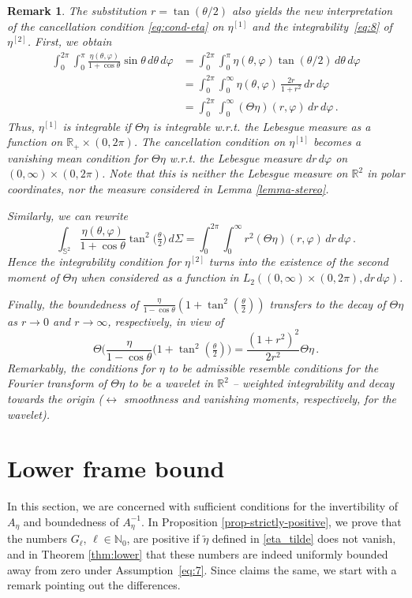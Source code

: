 \documentclass[a4paper,11pt,DIV=11,%
abstract=on%
]{scrartcl}
\newtheorem{rem}[thm]{Remark}
\def\R{{\mathbb R}}
\newcommand{\red}[1]{#1}
\begin{document}
\begin{rem}
	The substitution $r=\tan(\theta/2)$ also yields the new interpretation of the cancellation condition \eqref{eq:cond-eta} on $\eta^{[1]}$
		and the integrability~\red{\eqref{eq:8}} of $\eta^{[2]}$. First, we obtain
	\begin{align*}
		\int_0^{2\pi}\int_0^\pi\frac{\eta(\theta,\varphi)}{1+\cos\theta}\sin\theta\,d\theta\,d\varphi
		&=\int_0^{2\pi}\int_0^\pi\eta(\theta,\varphi)\tan(\theta/2)\,d\theta\,d\varphi\\
		&=\int_0^{2\pi}\int_0^\infty\eta(\theta,\varphi)\,\frac{2r}{1+r^2}\,dr\,d\varphi\\
		&=\int_0^{2\pi}\int_0^\infty(\Theta\eta)(r,\varphi)\,dr\,d\varphi\,.
	\end{align*}
	Thus, $\eta^{[1]}$ is integrable if $\Theta \eta$ 
	is integrable w.r.t. the Lebesgue measure as a function on $\R_+\times(0,2\pi)$.
	The cancellation condition on $\eta^{[1]}$
	 becomes a 	vanishing mean condition for $\Theta\eta$ w.r.t. the Lebesgue measure $dr\,d\varphi$ on
	$(0,\infty)\times(0,2\pi)$. Note that this is neither the Lebesgue measure on $\R^2$ in polar coordinates, nor
	the measure considered in Lemma \ref{lemma-stereo}. 
	
	Similarly, we can rewrite
	$$\int_{\mathbb S^2}\frac{\eta(\theta,\varphi)}{1+\cos\theta}\tan^2\bigl(\tfrac\theta2\bigr)\,d\Sigma
	=\int_0^{2\pi}\int_0^\infty r^2(\Theta\eta)(r,\varphi)\,dr\,d\varphi\,.$$
	Hence the integrability condition for $\eta^{[2]}$ turns into the existence of the second moment of
	$\Theta\eta$ when considered as a function in	$L_2((0,\infty)\times(0,2\pi),dr\,d\varphi)$.
	
	Finally, the boundedness of $\frac{\eta}{1-\cos\theta}(1+\tan^2(\frac\theta2))$ 
	transfers to the decay of $\Theta\eta$ as $r\to 0$ and $r\to\infty$, respectively, in view of
	$$\Theta\Big(\frac{\eta}{1-\cos\theta}\bigl(1+\tan^2(\tfrac\theta2)\Big)
	=\frac{(1+r^2)^2}{2r^2}\Theta\eta\,.$$
Remarkably, the conditions for $\eta$ to be admissible resemble conditions 
for the Fourier transform of $\Theta\eta$ to be a wavelet in $\R^2$ -- weighted integrability and decay towards the origin ($\longleftrightarrow$ smoothness and vanishing moments, respectively, for the wavelet).
\end{rem}

\section{Lower frame bound}\label{sec:lower-frame-bound}
In this section, we are concerned with sufficient conditions for the invertibility of $A_\eta$ and boundedness of
$A_\eta^{-1}$. 
In Proposition \ref{prop-strictly-positive}, we  prove that the numbers $G_\ell$, $\ell \in \mathbb N_0$, are positive
if $\tilde \eta$ defined in \eqref{eta_tilde} does not vanish, 
and in Theorem \ref{thm:lower} that these numbers are indeed uniformly bounded away from zero under \red{Assumption~\eqref{eq:7}.}
Since \cite[Prop. 3.4]{AV99} claims the same, we start with a remark pointing out the differences.
\end{document}
